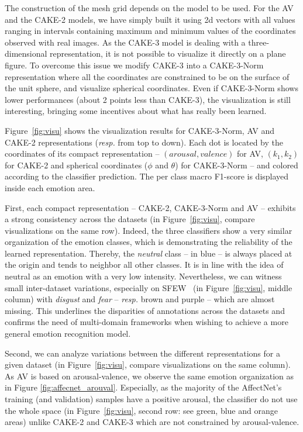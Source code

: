 \documentclass{bmvc2k}
\begin{document}
The construction of the mesh grid depends on the model to be used. 
For the AV and the CAKE-2 models, we have simply built it using 2d vectors with all values ranging in intervals containing maximum and minimum values of the coordinates observed with real images. As the CAKE-3 model is dealing with a three-dimensional representation, it is not possible to visualize it directly on a plane figure.
To overcome this issue we modify CAKE-3 into a CAKE-3-Norm representation where all the coordinates are constrained to be on the surface of the unit sphere, and visualize spherical coordinates. 
Even if CAKE-3-Norm shows lower performances (about 2 points less than CAKE-3), the visualization is still interesting, bringing some incentives about what has really been learned.

Figure~\ref{fig:visu} shows the visualization results  for CAKE-3-Norm, AV and CAKE-2 representations (\textit{resp.} from top to down).
Each dot is located by the coordinates of its compact representation -- \((arousal, valence)\) for AV, \((k_1, k_2)\) for CAKE-2 and spherical coordinates ($\phi$ and $\theta$) for CAKE-3-Norm -- and colored according to the classifier prediction. The per class macro F1-score is displayed inside each emotion area.

First, each compact representation -- CAKE-2, CAKE-3-Norm and AV -- exhibits a strong consistency across the datasets (in Figure~\ref{fig:visu}, compare visualizations on the same row). Indeed, the three classifiers show a very similar organization of the emotion classes, which is demonstrating the reliability of the learned representation. Thereby, the \textit{neutral} class -- in blue -- is always placed at the origin and tends to neighbor all other classes. It is in line with the idea of neutral as an emotion with a very low intensity. Nevertheless, we can witness small inter-dataset variations, especially on SFEW~\cite{dhall_static_2011} (in Figure~\ref{fig:visu}, middle column) with \textit{disgust} and \textit{fear} -- \textit{resp.} brown and purple -- which are almost missing. This underlines the disparities of annotations across the datasets and confirms the need of multi-domain frameworks when wishing to achieve a more general emotion recognition model.

Second, we can analyze variations between the different representations for a given dataset (in Figure~\ref{fig:visu}, compare visualizations on the same column). As AV is based on arousal-valence, we observe the same emotion organization as in Figure \ref{fig:affecnet_arouval}. Especially, as the majority of the AffectNet's training (and validation) samples have a positive arousal, the classifier do not use the whole space (in Figure~\ref{fig:visu}, second row: see green, blue and orange areas) unlike CAKE-2 and CAKE-3 which are not constrained by arousal-valence. 
\end{document}
